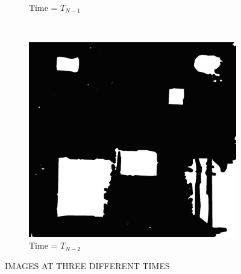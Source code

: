 \documentclass[twocolumn,10pt]{asme2e}
\begin{document}
\begin{figure}
\begin{subfigure}[b]{0.15\textwidth}
                \caption{Time = $T_{N-1}$}
                \label{fig:second latest image}
        \end{subfigure}
        ~ %
        \begin{subfigure}[b]{0.15\textwidth}
                \includegraphics[width=\textwidth]{processed3}
                \caption{Time = $T_{N-2}$}
                \label{fig:third latest image}
        \end{subfigure}
        \caption{IMAGES AT THREE DIFFERENT TIMES}\label{fig:individual maps}
\end{figure}%
%

\end{document}
